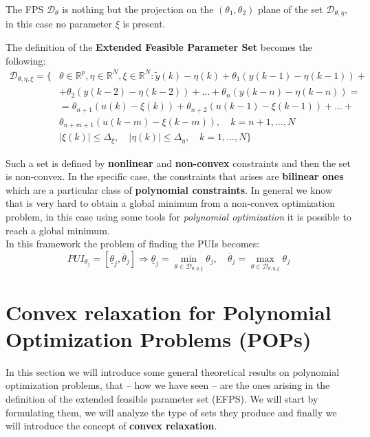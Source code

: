 \noindent
The FPS $\mathcal{D}_\theta$ is nothing but the projection on the $(\theta_1,\theta_2)$ plane of the set $\mathcal{D}_{\theta,\eta}$, in this case no parameter $\xi$ is present.

\noindent
The definition of the \textbf{Extended Feasible Parameter Set} becomes the following:
\begin{equation}
    \begin{aligned}
        \mathcal{D}_{\theta,\eta,\xi} = \{
            &\theta\in\mathbb{R}^p, \eta\in\mathbb{R}^N, \xi \in \mathbb{R}^N: 
            \tilde{y}(k)-\eta(k) + \theta_1 (y(k-1)-\eta(k-1)) +\\
            &+\theta_2 (y(k-2)-\eta(k-2))+\dots+\theta_n (y(k-n)-\eta(k-n))=\\
            &=\theta_{n+1} (u(k)-\xi(k))+\theta_{n+2} (u(k-1)-\xi(k-1)) + ...+\\
            &\theta_{n+m+1} (u(k-m)-\xi(k-m)), \quad k=n+1,...,N\\
             &\vert \xi(k) \vert \le \Delta_\xi, \quad 
            \vert \eta(k) \vert \le \Delta_\eta, \quad k=1,...,N
        \}
    \end{aligned}
\end{equation}

\noindent
Such a set is defined by \textbf{nonlinear} and \textbf{non-convex} constraints and then the set is non-convex. In the specific case, the constraints that arises are \textbf{bilinear ones} which are a particular class of \textbf{polynomial constraints}. In general we know that is very hard to obtain a global minimum from a non-convex optimization problem, in this case using some tools for \textit{polynomial optimization} it is possible to reach a global minimum.\\

\noindent
In this framework the problem of finding the PUIs becomes:
{\large{
    \begin{equation}
        PUI_{\theta_j} = [\underline{\theta}_j,\overline{\theta}_j] \Longrightarrow 
        \underline{\theta}_j = \min_{\theta\in\mathcal{D}_{\theta,\eta,\xi} } \theta_j,    \quad
        \overline{\theta}_j = \max_{\theta\in\mathcal{D}_{\theta,\eta,\xi}} \theta_j
    \end{equation}
}}

\section{Convex relaxation for Polynomial Optimization Problems (POPs)}
\begin{center}
    \textsf{
    In this section we will introduce some general theoretical results on polynomial optimization problems, that -- how we have seen -- are the ones arising in the definition of the extended feasible parameter set (EFPS). We will start by formulating them, we will analyze the type of sets they produce and finally we will introduce the concept of \textbf{convex relaxation}.}
\end{center}

